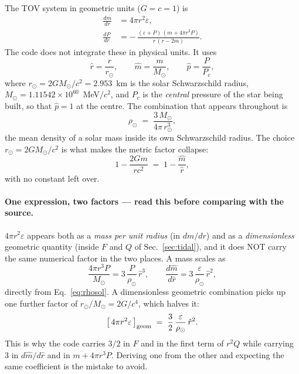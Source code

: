 \documentclass[aps,prc,onecolumn,superscriptaddress,nofootinbib,10pt]{revtex4-2}
\newcommand{\Msun}{M_\odot}
\newcommand{\rsun}{r_\odot}
\newcommand{\rhosol}{\rho_\odot}
\begin{document}
The TOV system in geometric units ($G = c = 1$) is
%
\begin{align}
\frac{dm}{dr} &= 4\pi r^2 \varepsilon ,
\label{eq:dmdr_phys}\\[2pt]
\frac{dP}{dr} &= -\,\frac{(\varepsilon + P)\,(m + 4\pi r^3 P)}
                          {r\,(r - 2m)} .
\label{eq:dpdr_phys}
\end{align}
%
The code does not integrate these in physical units. It uses
%
\begin{equation}
\hat r = \frac{r}{\rsun}, \qquad
\hat m = \frac{m}{\Msun}, \qquad
\hat p = \frac{P}{P_c},
\label{eq:scaling}
\end{equation}
%
where $\rsun = 2G\Msun/c^2 = 2.953$~km is the solar Schwarzschild radius,
$\Msun = 1.11542\times10^{60}$~MeV$/c^2$, and $P_c$ is the \emph{central}
pressure of the star being built, so that $\hat p = 1$ at the centre. The
combination that appears throughout is
%
\begin{equation}
\rhosol \;=\; \frac{3\,\Msun}{4\pi\,\rsun^3} ,
\label{eq:rhosol}
\end{equation}
%
the mean density of a solar mass inside its own Schwarzschild radius. The
choice $\rsun = 2G\Msun/c^2$ is what makes the metric factor collapse:
%
\begin{equation}
1 - \frac{2Gm}{rc^2} \;=\; 1 - \frac{\hat m}{\hat r} ,
\label{eq:metric}
\end{equation}
%
with no constant left over.

\paragraph{One expression, two factors --- read this before comparing with the
source.} $4\pi r^2 \varepsilon$ appears both as a \emph{mass per unit radius}
(in $dm/dr$) and as a \emph{dimensionless} geometric quantity (inside $F$ and
$Q$ of Sec.~\ref{sec:tidal}), and it does NOT carry the same numerical factor
in the two places. A mass scales as
%
\begin{equation}
\frac{4\pi r^3 P}{\Msun} = 3\,\frac{P}{\rhosol}\,\hat r^3 ,
\qquad
\frac{d\hat m}{d\hat r} = 3\,\frac{\varepsilon}{\rhosol}\,\hat r^2 ,
\label{eq:scale_mass}
\end{equation}
%
directly from Eq.~\eqref{eq:rhosol}. A dimensionless geometric combination
picks up one further factor of $\rsun/\Msun = 2G/c^4$, which halves it:
%
\begin{equation}
\big[\,4\pi r^2 \varepsilon\,\big]_{\rm geom}
   \;=\; \frac{3}{2}\,\frac{\varepsilon}{\rhosol}\,\hat r^2 .
\label{eq:scale_geom}
\end{equation}
%
This is why the code carries $3/2$ in $F$ and in the first term of $r^2Q$ while
carrying $3$ in $d\hat m/d\hat r$ and in $m + 4\pi r^3 P$. Deriving one from
the other and expecting the same coefficient is the mistake to avoid.
\end{document}
